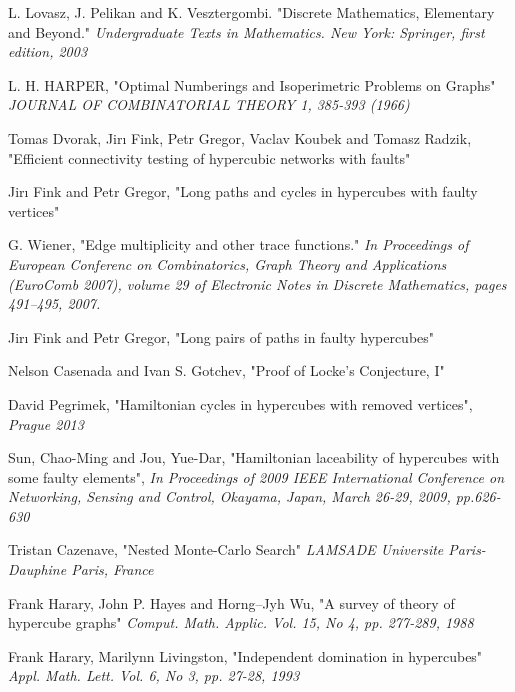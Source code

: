 \documentclass{pracamgr}
\begin{document}
  
\begin{thebibliography}{99}%

   L. Lovasz, J. Pelikan and K. Vesztergombi.
   "Discrete Mathematics, Elementary and Beyond."
   \textit{Undergraduate Texts in Mathematics. New York: Springer, first edition, 2003}   

   L. H. HARPER,
   "Optimal Numberings and Isoperimetric Problems on Graphs"
   \textit{JOURNAL OF COMBINATORIAL THEORY 1, 385-393 (1966)}
   
   Tomas Dvorak, Jirı Fink, Petr Gregor, Vaclav Koubek and Tomasz Radzik,
   "Efficient connectivity testing of hypercubic networks with faults"
   
   Jirı Fink and Petr Gregor,
   "Long paths and cycles in hypercubes with faulty vertices"
   
   G. Wiener,
   "Edge multiplicity and other trace functions."
   \textit{In Proceedings of European Conferenc on Combinatorics, Graph Theory and Applications (EuroComb 2007), volume 29 of
   Electronic Notes in Discrete Mathematics, pages 491–495, 2007.}
   
   Jirı Fink and Petr Gregor,
   "Long pairs of paths in faulty hypercubes"
  
   Nelson Casenada and Ivan S. Gotchev,
   "Proof of Locke's Conjecture, I"

   David Pegrimek,
   "Hamiltonian cycles in hypercubes with removed vertices",
   \textit{Prague 2013}
  
  Sun, Chao-Ming and Jou, Yue-Dar,
   "Hamiltonian laceability of hypercubes with some faulty elements",
   \textit{In Proceedings of 2009 IEEE International Conference on Networking, Sensing and Control, Okayama, Japan,
   March 26-29, 2009, pp.626-630}
  
   
   Tristan Cazenave,
   "Nested Monte-Carlo Search"
   \textit{LAMSADE Universite Paris-Dauphine Paris, France}   
   
   Frank Harary, John P. Hayes and Horng--Jyh Wu,
   "A survey of theory of hypercube graphs"
   \textit{Comput. Math. Applic. Vol. 15, No 4, pp. 277-289, 1988}
   
   Frank Harary, Marilynn Livingston,
   "Independent domination in hypercubes"
   \textit{Appl. Math. Lett. Vol. 6, No 3, pp. 27-28, 1993}
   

\end{thebibliography}
\end{document}
